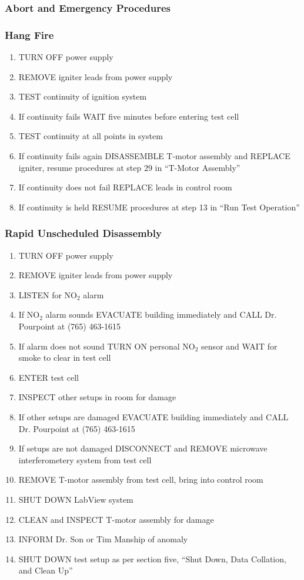 \subsubsection*{Abort and Emergency Procedures}

\subsubsection*{Hang Fire}
\begin{enumerate}
    \item TURN OFF power supply
     \item REMOVE igniter leads from power supply
     \item TEST continuity of ignition system
     \item If continuity fails WAIT five minutes before entering test cell
     \item TEST continuity at all points in system
     \item If continuity fails again DISASSEMBLE T-motor assembly and REPLACE igniter, resume procedures at step 29 in ``T-Motor Assembly''
     \item If continuity does not fail REPLACE leads in control room
     \item If continuity is held RESUME procedures at step 13 in ``Run Test Operation''
\end{enumerate}


\subsubsection*{Rapid Unscheduled Disassembly}
\begin{enumerate}
    \item TURN OFF power supply
     \item REMOVE igniter leads from power supply
     \item LISTEN for NO\(_2\) alarm
     \item If NO\(_2\) alarm sounds EVACUATE building immediately and CALL Dr. Pourpoint at (765) 463-1615
     \item If alarm does not sound TURN ON personal NO\(_2\) sensor and WAIT for smoke to clear in test cell
     \item ENTER test cell
     \item INSPECT other setups in room for damage
     \item If other setups are damaged EVACUATE building immediately and CALL Dr. Pourpoint at (765) 463-1615
     \item If setups are not damaged DISCONNECT and REMOVE microwave interferometery system from test cell
     \item REMOVE T-motor assembly from test cell, bring into control room
     \item SHUT DOWN LabView system
     \item CLEAN and INSPECT T-motor assembly for damage
     \item INFORM Dr. Son or Tim Manship of anomaly
     \item SHUT DOWN test setup as per section five, ``Shut Down, Data Collation, and Clean Up''
\end{enumerate}


